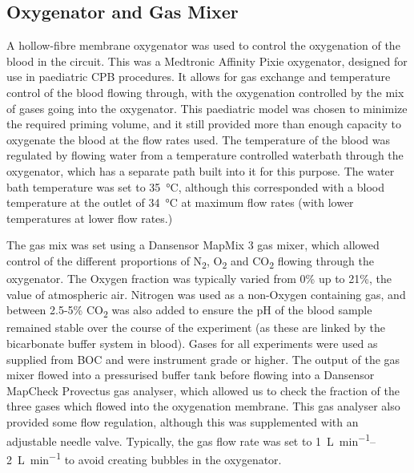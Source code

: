\subsection{Oxygenator and Gas Mixer}
A hollow-fibre membrane oxygenator was used to control the oxygenation of the blood in the circuit.
This was a Medtronic Affinity Pixie oxygenator, designed for use in paediatric CPB procedures.
It allows for gas exchange and temperature control of the blood flowing through, with the oxygenation controlled by the mix of gases going into the oxygenator.
This paediatric model was chosen to minimize the required priming volume, and it still provided more than enough capacity to oxygenate the blood at the flow rates used.
The temperature of the blood was regulated by flowing water from a temperature controlled waterbath through the oxygenator, which has a separate path built into it for this purpose.
The water bath temperature was set to \SI{35}{\degreeCelsius}, although this corresponded with a blood temperature at the outlet of \SI{34}{\degreeCelsius} at maximum flow rates (with lower temperatures at lower flow rates.)

The gas mix was set using a Dansensor MapMix 3 gas mixer, which allowed control of the different proportions of N\textsubscript{2}, O\textsubscript{2} and CO\textsubscript{2} flowing through the oxygenator.
The Oxygen fraction was typically varied from 0\% up to 21\%, the value of atmospheric air.
Nitrogen was used as a non-Oxygen containing gas, and between 2.5-5\% CO\textsubscript{2} was also added to ensure the pH of the blood sample remained stable over the course of the experiment (as these are linked by the bicarbonate buffer system in blood).
Gases for all experiments were used as supplied from BOC and were instrument grade or higher.
The output of the gas mixer flowed into a pressurised buffer tank before flowing into a Dansensor MapCheck Provectus gas analyser, which allowed us to check the fraction of the three gases which flowed into the oxygenation membrane.
This gas analyser also provided some flow regulation, although this was supplemented with an adjustable needle valve.
Typically, the gas flow rate was set to \SIrange{1}{2}{\liter\per\minute} to avoid creating bubbles in the oxygenator.

